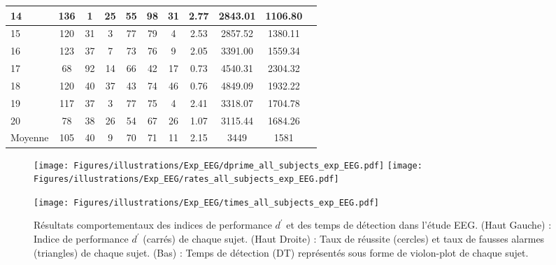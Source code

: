 \begin{table}[!h]
\begin{tabular}{|l||*{10}{c|}}
14 & 136 & 1 & 25 & 55 & 98 & 31 & 2.77 & 2843.01 & 1106.80 \\\hline
15 & 120 & 31 & 3 & 77 & 79 & 4 & 2.53 & 2857.52 & 1380.11 \\\hline
16 & 123 & 37 & 7 & 73 & 76 & 9 & 2.05 & 3391.00 & 1559.34 \\\hline
17 & 68 & 92 & 14 & 66 & 42 & 17 & 0.73 & 4540.31 & 2304.32 \\\hline
18 & 120 & 40 & 37 & 43 & 74 & 46 & 0.76 & 4849.09 & 1932.22 \\\hline
19 & 117 & 37 & 3 & 77 & 75 & 4 & 2.41 & 3318.07 & 1704.78 \\\hline
20 & 78 & 38 & 26 & 54 & 67 & 26 & 1.07 & 3115.44 & 1684.26 \\\hline
Moyenne & 105 & 40 & 9 & 70 & 71 & 11 & 2.15 & 3449 & 1581 \\\hline
\end{tabular}
\end{table}

\begin{figure*}[!t]
\texttt{[image: Figures/illustrations/Exp\_EEG/dprime\_all\_subjects\_exp\_EEG.pdf]}
\texttt{[image: Figures/illustrations/Exp\_EEG/rates\_all\_subjects\_exp\_EEG.pdf]}
\begin{minipage}{\textwidth}
\centering
\texttt{[image: Figures/illustrations/Exp\_EEG/times\_all\_subjects\_exp\_EEG.pdf]}
\end{minipage}
\caption[Résultats comportementaux de l'étude EEG.]{Résultats comportementaux des indices de performance $d^\prime$ et des temps de détection dans l'étude EEG. (Haut Gauche) : Indice de performance $d^\prime$ (carrés) de chaque sujet. (Haut Droite) : Taux de réussite (cercles) et taux de fausses alarmes (triangles) de chaque sujet. (Bas) : Temps de détection (DT) représentés sous forme de violon-plot de chaque sujet.}
\label{fig:figure5resultatscomportementaux}
\end{figure*}

